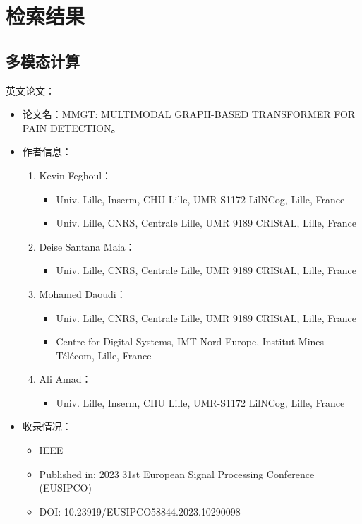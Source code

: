 \section{检索结果}
\subsection{多模态计算}

英文论文：
\begin{itemize}
    \item 论文名：MMGT: MULTIMODAL GRAPH-BASED TRANSFORMER FOR PAIN DETECTION。
    \item 作者信息：
        \begin{enumerate}
            \item Kevin Feghoul：
                \begin{itemize}
                    \item Univ. Lille, Inserm, CHU Lille, UMR-S1172 LilNCog, Lille, France
                    \item Univ. Lille, CNRS, Centrale Lille, UMR 9189 CRIStAL, Lille, France 
                \end{itemize}
            \item Deise Santana Maia：
                \begin{itemize}
                    \item Univ. Lille, CNRS, Centrale Lille, UMR 9189 CRIStAL, Lille, France
                \end{itemize}

            \item Mohamed Daoudi：
                \begin{itemize}
                    \item Univ. Lille, CNRS, Centrale Lille, UMR 9189 CRIStAL, Lille, France
                    \item Centre for Digital Systems, IMT Nord Europe, Institut Mines-Télécom, Lille, France
                \end{itemize}

            \item Ali Amad：
                \begin{itemize}
                    \item Univ. Lille, Inserm, CHU Lille, UMR-S1172 LilNCog, Lille, France
                \end{itemize}
        \end{enumerate}

    \item 收录情况：
        \begin{itemize}
            \item IEEE
            \item Published in: 2023 31st European Signal Processing Conference (EUSIPCO)
            \item DOI: 10.23919/EUSIPCO58844.2023.10290098
        \end{itemize}


\end{itemize}
